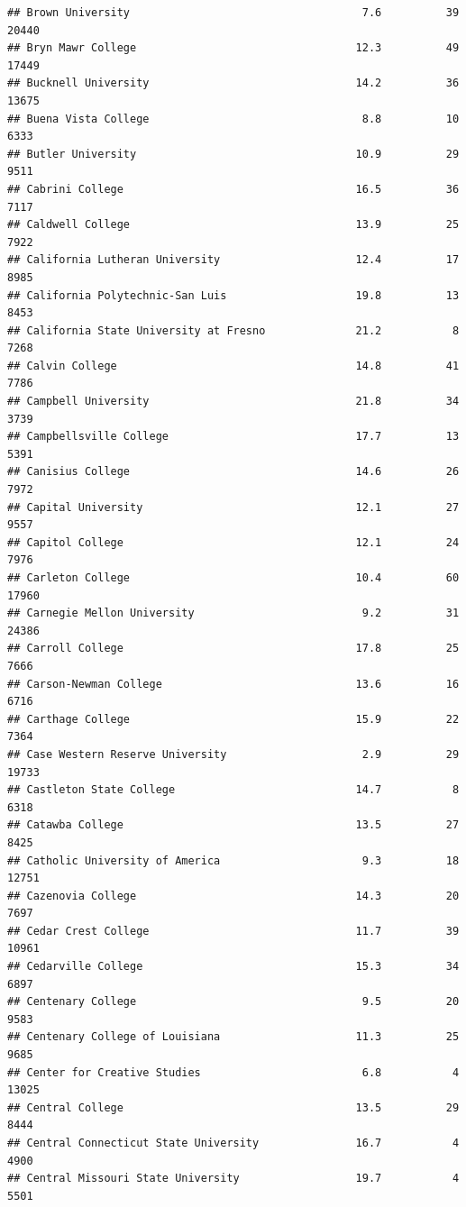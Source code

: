 \documentclass[
]{article}
\begin{document}
\begin{verbatim}
## Brown University                                    7.6          39  20440
## Bryn Mawr College                                  12.3          49  17449
## Bucknell University                                14.2          36  13675
## Buena Vista College                                 8.8          10   6333
## Butler University                                  10.9          29   9511
## Cabrini College                                    16.5          36   7117
## Caldwell College                                   13.9          25   7922
## California Lutheran University                     12.4          17   8985
## California Polytechnic-San Luis                    19.8          13   8453
## California State University at Fresno              21.2           8   7268
## Calvin College                                     14.8          41   7786
## Campbell University                                21.8          34   3739
## Campbellsville College                             17.7          13   5391
## Canisius College                                   14.6          26   7972
## Capital University                                 12.1          27   9557
## Capitol College                                    12.1          24   7976
## Carleton College                                   10.4          60  17960
## Carnegie Mellon University                          9.2          31  24386
## Carroll College                                    17.8          25   7666
## Carson-Newman College                              13.6          16   6716
## Carthage College                                   15.9          22   7364
## Case Western Reserve University                     2.9          29  19733
## Castleton State College                            14.7           8   6318
## Catawba College                                    13.5          27   8425
## Catholic University of America                      9.3          18  12751
## Cazenovia College                                  14.3          20   7697
## Cedar Crest College                                11.7          39  10961
## Cedarville College                                 15.3          34   6897
## Centenary College                                   9.5          20   9583
## Centenary College of Louisiana                     11.3          25   9685
## Center for Creative Studies                         6.8           4  13025
## Central College                                    13.5          29   8444
## Central Connecticut State University               16.7           4   4900
## Central Missouri State University                  19.7           4   5501

\end{verbatim}
\end{document}

